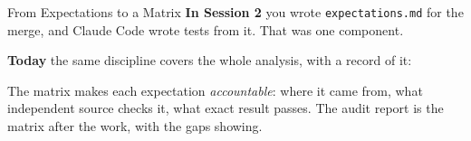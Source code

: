\documentclass[aspectratio=169, 11pt]{beamer}
\begin{document}

\begin{frame}{From Expectations to a Matrix}
  \textbf{In Session 2} you wrote \texttt{expectations.md} for the merge, and Claude Code wrote tests from it. That was one component.

  \vspace{0.4em}
  \textbf{Today} the same discipline covers the whole analysis, with a record of it:

  \vspace{0.4em}
  \centering

  \vspace{0.6em}
  \raggedright
  The matrix makes each expectation \emph{accountable}: where it came from, what independent source checks it, what exact result passes. The audit report is the matrix after the work, with the gaps showing.
\end{frame}
\end{document}
